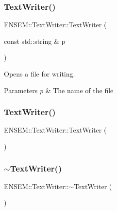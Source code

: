 \subsubsection{\texorpdfstring{TextWriter()}{TextWriter()}\hspace{0.1cm}{\footnotesize\ttfamily [2/6]}}
{\footnotesize\ttfamily E\+N\+S\+E\+M\+::\+Text\+Writer\+::\+Text\+Writer (\begin{DoxyParamCaption}\item[{const std\+::string \&}]{p }\end{DoxyParamCaption})\hspace{0.3cm}{\ttfamily [explicit]}}

Opens a file for writing. 
\begin{DoxyParams}{Parameters}
{\em p} & The name of the file \\
\hline
\end{DoxyParams}
\mbox{\label{classENSEM_1_1TextWriter_ad0b4ad57a3e91011920a473244447cac}} 
\subsubsection{\texorpdfstring{TextWriter()}{TextWriter()}\hspace{0.1cm}{\footnotesize\ttfamily [3/6]}}
{\footnotesize\ttfamily E\+N\+S\+E\+M\+::\+Text\+Writer\+::\+Text\+Writer (\begin{DoxyParamCaption}{ }\end{DoxyParamCaption})}

\mbox{\label{classENSEM_1_1TextWriter_a2aa3ba4260c005b4a2910046448cc193}} 
\subsubsection{\texorpdfstring{$\sim$TextWriter()}{~TextWriter()}\hspace{0.1cm}{\footnotesize\ttfamily [2/3]}}
{\footnotesize\ttfamily E\+N\+S\+E\+M\+::\+Text\+Writer\+::$\sim$\+Text\+Writer (\begin{DoxyParamCaption}{ }\end{DoxyParamCaption})}

